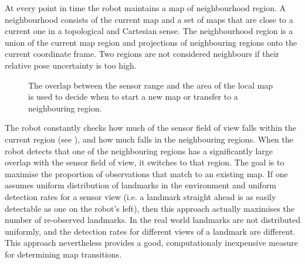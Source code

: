At every point in time the robot maintains a map of neighbourhood
region. A neighbourhood consists of the current map and a set of maps
that are close to a current one in a topological and Cartesian sense.
The neighbourhood region is a union of the current map region and
projections of neighbouring regions onto the current coordinate frame.
Two regions are not considered neighbours if their relative pose
uncertainty is too high.

\begin{figure}
\begin{center}
\quad \quad \quad
{}\quad
{}
\end{center}
\caption[Map regions used for triggering transition events]
{The overlap between the sensor range and the area of the local 
 map is used to decide when to start a new map or transfer to a 
 neighbouring region.}
\label{fig:StartNew}
\end{figure}

The robot constantly checks how much of the sensor field of view falls
within the current region (see ), and how much
falls in the neighbouring regions. When the robot detects that one of
the neighbouring regions has a significantly large overlap with the
sensor field of view, it switches to that region. The goal is to
maximise the proportion of observations that match to an existing map.
If one assumes uniform distribution of landmarks in the environment
and uniform detection rates for a sensor view (i.e. a landmark
straight ahead is as easily detectable as one on the robot's left),
then this approach actually maximises the number of re-observed
landmarks. In the real world landmarks are not distributed uniformly,
and the detection rates for different views of a landmark are
different. This approach nevertheless provides a good, computationaly
inexpensive measure for determining map transitions.

